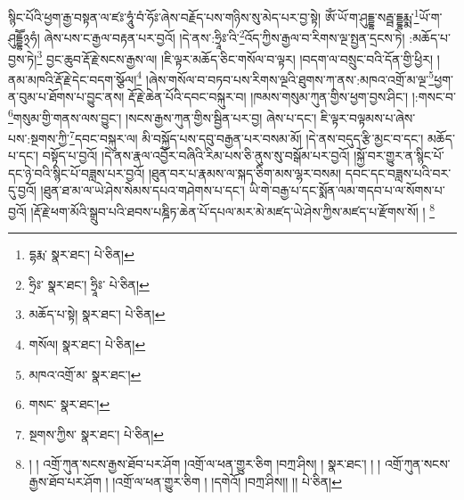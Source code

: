 སྙིང་པོའི་ཕྱག་རྒྱ་བསྟན་ལ་ཛཿ་ཧཱུཾ་བཾ་ཧོཿ་ཞེས་བརྗོད་པས་གཉིས་སུ་མེད་པར་བྱ་སྟེ། ཨོཾ་ཡོ་ག་ཤུདྡྷ་སརྦྦ་དྡྷརྨྨ་\footnote{དྷརྨ་  སྣར་ཐང་།  པེ་ཅིན། }ཡོ་ག་ཤུདྡྷཽ྅ཧཾ། ཞེས་པས་ང་རྒྱལ་བརྟན་པར་བྱའོ། །དེ་ནས་:ཧྲཱིཿ་འི་\footnote{ཧྲིཿ་  སྣར་ཐང་། ཧྲཱིཿ་  པེ་ཅིན། }འོད་ཀྱིས་རྒྱལ་བ་རིགས་ལྔ་སྤྱན་དྲངས་ཏེ། :མཆོད་པ་བྱས་ཏེ།\footnote{མཆོད་པ་སྟེ།  སྣར་ཐང་།  པེ་ཅིན། } བྱང་ཆུབ་རྡོ་རྗེ་སངས་རྒྱས་ལ། །ཇི་ལྟར་མཆོད་ཅིང་གསོལ་བ་ལྟར། །བདག་ལ་བསྲུང་བའི་དོན་གྱི་ཕྱིར། །ནམ་མཁའི་རྡོ་རྗེ་དེང་བདག་སྩོལ།\footnote{གསོལ།  སྣར་ཐང་།  པེ་ཅིན། } །ཞེས་གསོལ་བ་བཏབ་པས་རིགས་ལྔའི་ཐུགས་ཀ་ནས་:མཁའ་འགྲོ་མ་ལྔ་\footnote{མཁའ་འགྲོ་མ་  སྣར་ཐང་། }ཕྱག་ན་བུམ་པ་ཐོགས་པ་བྱུང་ནས། རྡོ་རྗེ་ཆེན་པོའི་དབང་བསྐུར་བ། །ཁམས་གསུམ་ཀུན་གྱིས་ཕྱག་བྱས་ཤིང་། །:གསང་བ་\footnote{གསང་  སྣར་ཐང་། }གསུམ་གྱི་གནས་ལས་བྱུང་། །སངས་རྒྱས་ཀུན་གྱིས་སྦྱིན་པར་བྱ། ཞེས་པ་དང་། ཇི་ལྟར་བལྟམས་པ་ཞེས་པས་:སྔགས་ཀྱི་\footnote{སྔགས་ཀྱིས་  སྣར་ཐང་།  པེ་ཅིན། }དབང་བསྐུར་ལ། མི་བསྐྱོད་པས་དབུ་བརྒྱན་པར་བསམ་མོ། །དེ་ནས་བདུད་རྩི་མྱང་བ་དང་། མཆོད་པ་དང་། བསྟོད་པ་བྱའོ། །དེ་ནས་རྣལ་འབྱོར་བཞིའི་རིམ་པས་ཅི་ནུས་སུ་བསྒོམ་པར་བྱའོ། །སྐྱོ་བར་གྱུར་ན་སྙིང་པོ་དང་ཉེ་བའི་སྙིང་པོ་བཟླས་པར་བྱའོ། །ཐུན་བར་པ་རྣམས་ལ་སྐད་ཅིག་མས་ལྷར་བསམ། དབང་དང་བཟླས་པའི་བར་དུ་བྱའོ། །ཐུན་ཐ་མ་ལ་ཡེ་ཤེས་སེམས་དཔའ་གཤེགས་པ་དང་། ཡི་གེ་བརྒྱ་པ་དང་སྨོན་ལམ་གདབ་པ་ལ་སོགས་པ་བྱའོ། །རྡོ་རྗེ་ཕག་མོའི་སྒྲུབ་པའི་ཐབས་པཎྜིཏ་ཆེན་པོ་དཔལ་མར་མེ་མཛད་ཡེ་ཤེས་ཀྱིས་མཛད་པ་རྫོགས་སོ། ། \footnote{། ། འགྲོ་ཀུན་སངས་རྒྱས་ཐོབ་པར་ཤོག །འགྲོ་ལ་ཕན་གྱུར་ཅིག །བཀྲ་ཤིས། །  སྣར་ཐང་། ། ། འགྲོ་ཀུན་སངས་རྒྱས་ཐོབ་པར་ཤོག ། །འགྲོ་ལ་ཕན་གྱུར་ཅིག ། །དགེའོ། །བཀྲ་ཤིས།། །།  པེ་ཅིན། }